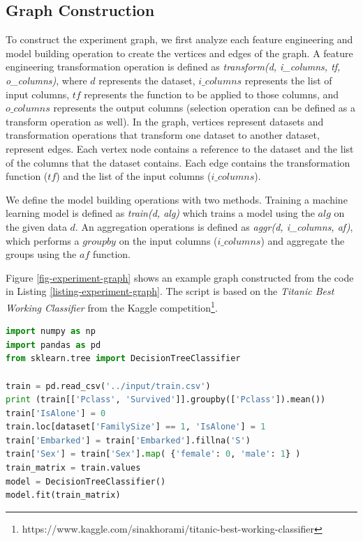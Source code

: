 
\subsection{Graph Construction}
To construct the experiment graph, we first analyze each feature engineering and model building operation to create the vertices and edges of the graph.
A feature engineering transformation operation is defined as \textit{transform(d, i\_columns, tf, o\_columns)}, where $d$ represents the dataset, $i\_columns$ represents the list of input columns, $tf$ represents the function to be applied to those columns, and $o\_columns$ represents the output columns (selection operation can be defined as a transform operation as well). 
In the graph, vertices represent datasets and transformation operations that transform one dataset to another dataset, represent edges.
Each vertex node contains a reference to the dataset and the list of the columns that the dataset contains.
Each edge contains the transformation function ($tf$) and the list of the input columns ($i\_columns$).

We define the model building operations with two methods.
Training a machine learning model is defined as \textit{train(d, alg)} which trains a model using the $alg$ on the given data $d$.
An aggregation operations is defined as \textit{aggr(d, i\_columns, af)}, which performs a $groupby$ on the input columns ($i\_columns$) and aggregate the groups using the $af$ function.

Figure \ref{fig-experiment-graph} shows an example graph constructed from the code in Listing \ref{listing-experiment-graph}.
The script is based on the \textit{Titanic Best Working Classifier} from the Kaggle competition\footnote{https://www.kaggle.com/sinakhorami/titanic-best-working-classifier}.

\begin{lstlisting}[language=Python, caption=Example script,captionpos=b,label = {listing-experiment-graph}]
import numpy as np
import pandas as pd
from sklearn.tree import DecisionTreeClassifier

train = pd.read_csv('../input/train.csv')
print (train[['Pclass', 'Survived']].groupby(['Pclass']).mean())
train['IsAlone'] = 0
train.loc[dataset['FamilySize'] == 1, 'IsAlone'] = 1
train['Embarked'] = train['Embarked'].fillna('S') 
train['Sex'] = train['Sex'].map( {'female': 0, 'male': 1} )
train_matrix = train.values
model = DecisionTreeClassifier()
model.fit(train_matrix)
\end{lstlisting}

